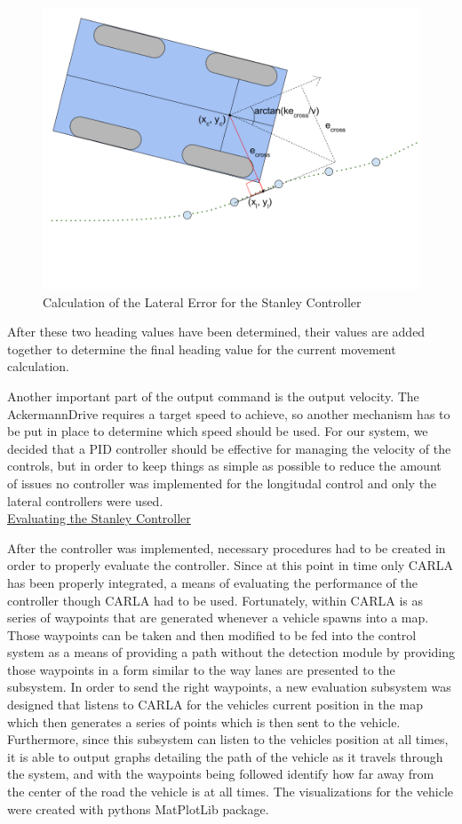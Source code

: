 \documentclass[titlepage,draft]{article}
\begin{document}
{\begin{figure}
	\centering
	\includegraphics[width=5in]{stanley_lateral_error}
	\caption{Calculation of the Lateral Error for the Stanley Controller}
	\label{fig:stanley_lateral_calc}
\end{figure}

After these two heading values have been determined, their values are added together to determine the final heading value for the current movement calculation.

Another important part of the output command is the output velocity. The AckermannDrive requires a target speed to achieve, so another mechanism has to be put in place to determine which speed should be used. For our system, we decided that a PID controller should be effective for managing the velocity of the controls, but in order to keep things as simple as possible to reduce the amount of issues no controller was implemented for the longitudal control and only the lateral controllers were used.
\\

\underline{Evaluating the Stanley Controller}

After the controller was implemented, necessary procedures had to be created in order to properly evaluate the controller. Since at this point in time only CARLA has been properly integrated, a means of evaluating the performance of the controller though CARLA had to be used. Fortunately, within CARLA is as series of waypoints that are generated whenever a vehicle spawns into a map. Those waypoints can be taken and then modified to be fed into the control system as a means of providing a path without the detection module by providing those waypoints in a form similar to the way lanes are presented to the subsystem. In order to send the right waypoints, a new evaluation subsystem was designed that listens to CARLA for the vehicles current position in the map which then generates a series of points which is then sent to the vehicle. Furthermore, since this subsystem can listen to the vehicles position at all times, it is able to output graphs detailing the path of the vehicle as it travels through the system, and with the waypoints being followed identify how far away from the center of the road the vehicle is at all times. The visualizations for the vehicle were created with pythons MatPlotLib package.

}
\end{document}
